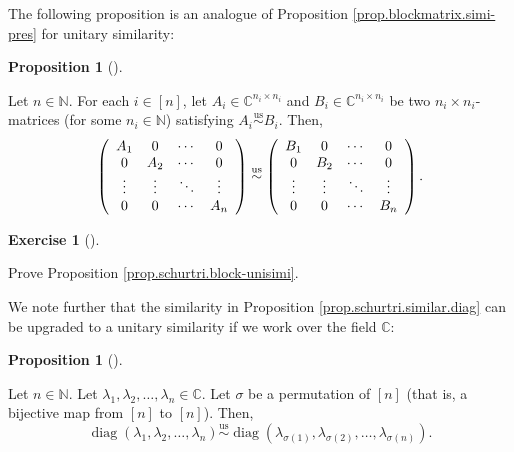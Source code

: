 \documentclass[numbers=enddot,12pt,final,onecolumn,notitlepage]{scrartcl}%
\newcounter{exer}
\numberwithin{exer}{subsection}
\theoremstyle{definition}
\newtheorem{prop}[theo]{Proposition}
\newenvironment{proposition}[1][]
{\begin{prop}[#1]\begin{leftbar}}
{\end{leftbar}\end{prop}}
\newtheorem{exmp}[exer]{Exercise}
\newenvironment{exercise}[1][]
{\begin{exmp}[#1]\begin{leftbar}}
{\end{leftbar}\end{exmp}}
\begin{document}
The following proposition is an analogue of Proposition
\ref{prop.blockmatrix.simi-pres} for unitary similarity:

\begin{proposition}
\label{prop.schurtri.block-unisimi}Let $n\in\mathbb{N}$. For each $i\in\left[
n\right]  $, let $A_{i}\in\mathbb{C}^{n_{i}\times n_{i}}$ and $B_{i}%
\in\mathbb{C}^{n_{i}\times n_{i}}$ be two $n_{i}\times n_{i}$-matrices (for
some $n_{i}\in\mathbb{N}$) satisfying $A_{i}\overset{\operatorname*{us}}{\sim
}B_{i}$. Then,%
\[
\left(
\begin{array}
[c]{cccc}%
A_{1} & 0 & \cdots & 0\\
0 & A_{2} & \cdots & 0\\
\vdots & \vdots & \ddots & \vdots\\
0 & 0 & \cdots & A_{n}%
\end{array}
\right)  \overset{\operatorname*{us}}{\sim}\left(
\begin{array}
[c]{cccc}%
B_{1} & 0 & \cdots & 0\\
0 & B_{2} & \cdots & 0\\
\vdots & \vdots & \ddots & \vdots\\
0 & 0 & \cdots & B_{n}%
\end{array}
\right)  .
\]

\end{proposition}

\begin{exercise}
\label{exe.schurtri.block-unisimi} Prove Proposition
\ref{prop.schurtri.block-unisimi}.
\end{exercise}

We note further that the similarity in Proposition
\ref{prop.schurtri.similar.diag} can be upgraded to a unitary similarity if we
work over the field $\mathbb{C}$:

\begin{proposition}
\label{prop.schurtri.unisimi.diag}Let $n\in\mathbb{N}$. Let $\lambda
_{1},\lambda_{2},\ldots,\lambda_{n}\in\mathbb{C}$. Let $\sigma$ be a
permutation of $\left[  n\right]  $ (that is, a bijective map from $\left[
n\right]  $ to $\left[  n\right]  $). Then,%
\[
\operatorname*{diag}\left(  \lambda_{1},\lambda_{2},\ldots,\lambda_{n}\right)
\overset{\operatorname*{us}}{\sim}\operatorname*{diag}\left(  \lambda
_{\sigma\left(  1\right)  },\lambda_{\sigma\left(  2\right)  },\ldots
,\lambda_{\sigma\left(  n\right)  }\right)  .
\]

\end{proposition}
\end{document}
